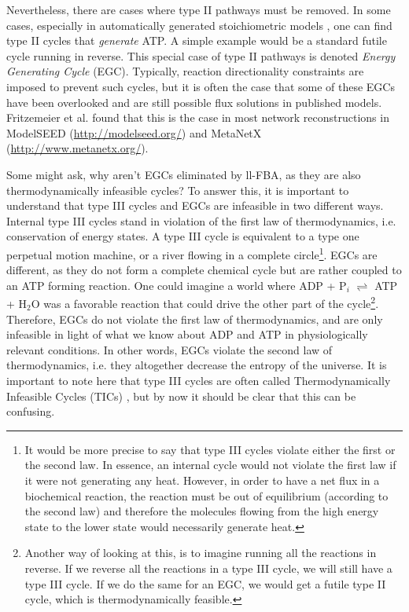 \documentclass[twocolumn]{bmcart}%
\begin{document}
Nevertheless, there are cases where type II pathways must be removed. In some cases, especially in automatically generated stoichiometric models \cite{Fritzemeier2017-ba}, one can find type II cycles that \textit{generate} ATP. A simple example would be a standard futile cycle running in reverse. This special case of type II pathways is denoted \textit{Energy Generating Cycle} (EGC). Typically, reaction directionality constraints are imposed to prevent such cycles, but it is often the case that some of these EGCs have been overlooked and are still possible flux solutions in published models. Fritzemeier et al. \cite{Fritzemeier2017-ba} found that this is the case in most network reconstructions in ModelSEED (\url{http://modelseed.org/}) and MetaNetX (\url{http://www.metanetx.org/}). 

Some might ask, why aren't EGCs eliminated by ll-FBA, as they are also thermodynamically infeasible cycles? To answer this, it is important to understand that type III cycles and EGCs are infeasible in two different ways. Internal type III cycles stand in violation of the first law of thermodynamics, i.e. conservation of energy states. A type III cycle is equivalent to a type one perpetual motion machine, or a river flowing in a complete circle\footnote{It would be more precise to say that type III cycles violate either the first or the second law. In essence, an internal cycle would not violate the first law if it were not generating any heat. However, in order to have a net flux in a biochemical reaction, the reaction must be out of equilibrium (according to the second law) and therefore the molecules flowing from the high energy state to the lower state would necessarily generate heat.}. EGCs are different, as they do not form a complete chemical cycle but are rather coupled to an ATP forming reaction. One could imagine a world where ADP + P$_i$ $\rightleftharpoons$ ATP + H$_2$O was a favorable reaction that could drive the other part of the cycle\footnote{Another way of looking at this, is to imagine running all the reactions in reverse. If we reverse all the reactions in a type III cycle, we will still have a type III cycle. If we do the same for an EGC, we would get a futile type II cycle, which is thermodynamically feasible.}. Therefore, EGCs do not violate the first law of thermodynamics, and are only infeasible in light of what we know about ADP and ATP in physiologically relevant conditions. In other words, EGCs violate the second law of thermodynamics, i.e. they altogether decrease the entropy of the universe. It is important to note here that type III cycles are often called Thermodynamically Infeasible Cycles (TICs) \cite{DeMartino2013, Desouki2015-lh}, but by now it should be clear that this can be confusing.
\end{document}
